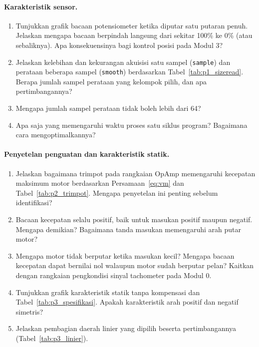 \documentclass[11pt,a4paper]{article}
\begin{document}
\paragraph{Karakteristik sensor.}
\begin{enumerate}
	\item Tunjukkan grafik bacaan potensiometer ketika diputar satu putaran penuh. Jelaskan mengapa bacaan berpindah langsung dari sekitar 100\% ke 0\% (atau sebaliknya). Apa konsekuensinya bagi kontrol posisi pada Modul 3?
	\item Jelaskan kelebihan dan kekurangan akuisisi satu sampel (\texttt{sample}) dan perataan beberapa sampel (\texttt{smooth}) berdasarkan Tabel~\ref{tab:p1_sizeread}. Berapa jumlah sampel perataan yang kelompok pilih, dan apa pertimbangannya?
	\item Mengapa jumlah sampel perataan tidak boleh lebih dari 64?
	\item Apa saja yang memengaruhi waktu proses satu siklus program? Bagaimana cara mengoptimalkannya?
\end{enumerate}

\paragraph{Penyetelan penguatan dan karakteristik statik.}
\begin{enumerate}[resume]
	\item Jelaskan bagaimana trimpot pada rangkaian OpAmp memengaruhi kecepatan maksimum motor berdasarkan Persamaan~\eqref{eq:vm} dan Tabel~\ref{tab:p2_trimpot}. Mengapa penyetelan ini penting sebelum identifikasi?
	\item Bacaan kecepatan selalu positif, baik untuk masukan positif maupun negatif. Mengapa demikian? Bagaimana tanda masukan memengaruhi arah putar motor?
	\item Mengapa motor tidak berputar ketika masukan kecil? Mengapa bacaan kecepatan dapat bernilai nol walaupun motor sudah berputar pelan? Kaitkan dengan rangkaian pengkondisi sinyal tachometer pada Modul 0.
	\item Tunjukkan grafik karakteristik statik tanpa kompensasi dan Tabel~\ref{tab:p3_spesifikasi}. Apakah karakteristik arah positif dan negatif simetris?
	\item Jelaskan pembagian daerah linier yang dipilih beserta pertimbangannya (Tabel~\ref{tab:p3_linier}).
\end{enumerate}
\end{document}
